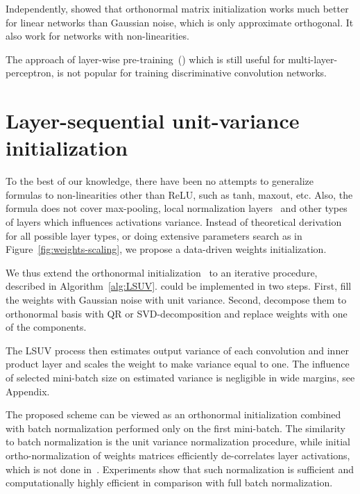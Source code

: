 \documentclass{article} \clearpage{}\usepackage{iclr2016_conference,times}
\begin{document}
Independently, \cite{OrthoNorm2013} showed that orthonormal matrix initialization works much better for linear networks than Gaussian noise, which is only approximate orthogonal. It also work for networks with non-linearities.

The approach of layer-wise pre-training~(\cite{Bengio2006}) which is still useful for multi-layer-perceptron, is not popular for training discriminative convolution networks. 
\section{Layer-sequential unit-variance initialization}
\label{sec:algorithm}
To the best of our knowledge, there have been no attempts to generalize~\cite{Xavier10} formulas to non-linearities other than ReLU, such as tanh, maxout, etc. Also, the formula does not cover max-pooling, local normalization layers~\cite{AlexNet2012} and other types of layers which influences activations variance.
Instead of theoretical derivation for all possible layer types, or doing extensive parameters search as in Figure~\ref{fig:weights-scaling}, we propose a data-driven weights initialization.

We thus extend the orthonormal initialization~\cite{OrthoNorm2013} to an iterative procedure, described in Algorithm~\ref{alg:LSUV}. \cite{OrthoNorm2013} could be implemented in two steps. First, fill the weights with Gaussian noise with unit variance. Second, decompose them to orthonormal basis with QR or SVD-decomposition and replace weights with one of the components. 

The LSUV process then estimates output variance of each convolution and inner product layer and scales the weight to make variance equal to one. The influence of selected mini-batch size on estimated variance is negligible in wide margins, see Appendix.

The proposed scheme can be viewed as an orthonormal initialization combined with batch normalization performed only on the first mini-batch. The similarity to batch normalization is the unit variance normalization procedure, while initial ortho-normalization of weights matrices efficiently de-correlates layer activations, which is not done in~\cite{BatchNorm2015}. Experiments show that such normalization is sufficient and computationally highly efficient in comparison with full batch normalization.
\end{document}
